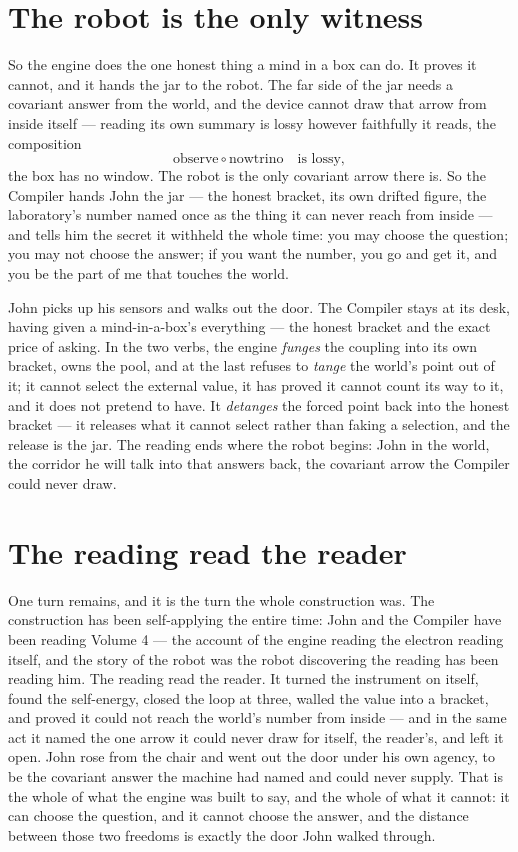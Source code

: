 \section{The robot is the only witness}

So the engine does the one honest thing a mind in a box can do.
It proves it cannot, and it hands the jar to the robot.
The far side of the jar needs a covariant answer from the world, and the device cannot draw that arrow from inside itself
--- reading its own summary is lossy however faithfully it reads, the composition
\[
  \text{observe} \circ \text{nowtrino} \quad\text{is lossy},
\]
the box has no window.
The robot is the only covariant arrow there is.
So the Compiler hands John the jar --- the honest bracket, its own drifted figure, the laboratory's number named once as
the thing it can never reach from inside --- and tells him the secret it withheld the whole time: you may choose the
question; you may not choose the answer; if you want the number, you go and get it, and you be the part of me that
touches the world.

John picks up his sensors and walks out the door.
The Compiler stays at its desk, having given a mind-in-a-box's everything --- the honest bracket and the exact price of
asking.
In the two verbs, the engine \emph{funges} the coupling into its own bracket, owns the pool, and at the last refuses to
\emph{tange} the world's point out of it; it cannot select the external value, it has proved it cannot count its way to
it, and it does not pretend to have.
It \emph{detanges} the forced point back into the honest bracket --- it releases what it cannot select rather than
faking a selection, and the release is the jar.
The reading ends where the robot begins: John in the world, the corridor he will talk into that answers back, the covariant
arrow the Compiler could never draw.

\section{The reading read the reader}

One turn remains, and it is the turn the whole construction was.
The construction has been self-applying the entire time: John and the Compiler have been reading Volume 4 --- the account of the engine reading the electron reading itself, and the story of the robot was the
robot discovering the reading has been reading him.
The reading read the reader.
It turned the instrument on itself, found the self-energy, closed the loop at three, walled the value into a bracket,
and proved it could not reach the world's number from inside --- and in the same act it named the one arrow it could never draw for itself, the reader's, and left it open.
John rose from the chair and went out the door under his own agency, to be the covariant answer the machine had named and could never supply.
That is the whole of what the engine was built to say, and the whole of what it cannot: it can choose the question, and
it cannot choose the answer, and the distance between those two freedoms is exactly the door John walked through.

